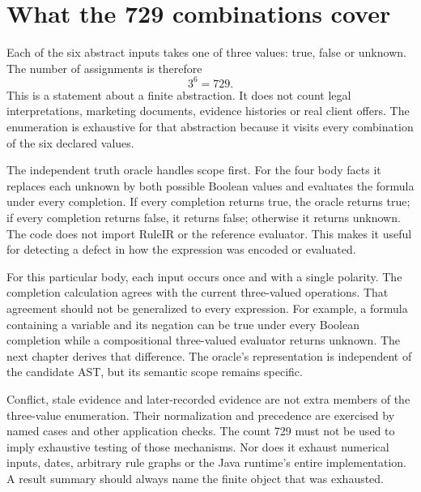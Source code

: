 \section{What the 729 combinations cover}
\label{merge:M02:04}

\label{sec:circular-enumeration}
Each of the six abstract inputs takes one of three values: true, false or
unknown. The number of assignments is therefore
\begin{equation}
 3^6=729.
 \label{eq:case-domain-size}
\end{equation}
This is a statement about a finite abstraction. It does not count legal
interpretations, marketing documents, evidence histories or real client offers.
The enumeration is exhaustive for that abstraction because it visits every
combination of the six declared values.

The independent truth oracle handles scope first. For the four body facts it
replaces each unknown by both possible Boolean values and evaluates the formula
under every completion. If every completion returns true, the oracle returns
true; if every completion returns false, it returns false; otherwise it returns
unknown. The code does not import RuleIR or the reference evaluator. This makes
it useful for detecting a defect in how the expression was encoded or evaluated.


For this particular body, each input occurs once and with a single polarity.
The completion calculation agrees with the current three-valued operations.
That agreement should not be generalized to every expression. For example, a
formula containing a variable and its negation can be true under every Boolean
completion while a compositional three-valued evaluator returns unknown. The
next chapter derives that difference. The oracle's representation is independent
of the candidate AST, but its semantic scope remains specific.

Conflict, stale evidence and later-recorded evidence are not extra members of
the three-value enumeration. Their normalization and precedence are exercised
by named cases and other application checks. The count 729 must not be used to
imply exhaustive testing of those mechanisms. Nor does it exhaust numerical
inputs, dates, arbitrary rule graphs or the Java runtime's entire implementation.
A result summary should always name the finite object that was exhausted.

